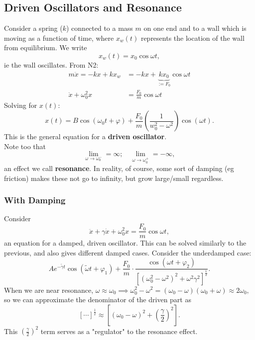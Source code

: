 \documentclass[12pt]{article}
\begin{document}
\subsection{Driven Oscillators and Resonance}


Consider a spring ($k$) connected to a mass $m$ on one end and to a wall which is moving as a function of time, where $x_w(t)$ represents the location of the wall from equilibrium. We write \[x_w(t) = x_0 \cos \omega t,\] ie the wall oscillates. From N2:
\begin{align*}
  m \ddot{x} = -kx + kx_w &= -kx + \underbrace{k x_0}_{:= F_0} \cos \omega t\\
  \ddot{x} + \omega_0^2x &= \frac{F_0}{m} \cos \omega t
\end{align*}
Solving for $x(t)$:
\[x(t) = B \cos (\omega_0t + \varphi) + \frac{F_0}{m} \left(\frac{1}{w_0^2 - \omega^2}\right)\cos (\omega t).\]
This is the general equation for a \textbf{driven oscillator}.\\
Note too that \[\lim_{\omega \to \omega_0^-} = \infty; \quad \lim_{\omega \to \omega_0^+} = - \infty,\] an effect we call \textbf{resonance}. In reality, of course, some sort of damping (eg friction) makes these not go to infinity, but grow large/small regardless.\\
\subsubsection{With Damping}

Consider \[\ddot{x} + \gamma \dot x + \omega_0^2 x = \frac{F_0}{m} \cos \omega t,\] an equation for a damped, driven oscillator. This can be solved similarly to the previous, and also gives different damped cases. Consider the underdamped case:
\[Ae^{-\tilde{\gamma}t}\cos(\tilde \omega t + \varphi_1) + \frac{F_0}{m}\cdot \frac{\cos(\omega t + \varphi_2)}{\left[(\omega_0^2-\omega^2)^2+\omega^2\gamma^2\right]^\frac{1}{2}}.\] When we are near resonance, $\omega \approx \omega_0 \implies \omega_0^2 - \omega^2 = (\omega_0 - \omega)(\omega_0+\omega) \approx 2 \omega_0,$ so we can approximate the denominator of the driven part as \[\left[\cdots \right]^\frac{1}{2}\approx \left[(\omega_0-\omega)^2 + \left(\frac{\gamma}{2}\right)^2\right].\]
This $\left(\frac{\gamma}{2}\right)^2$ term serves as a "regulator" to the resonance effect.
\end{document}
